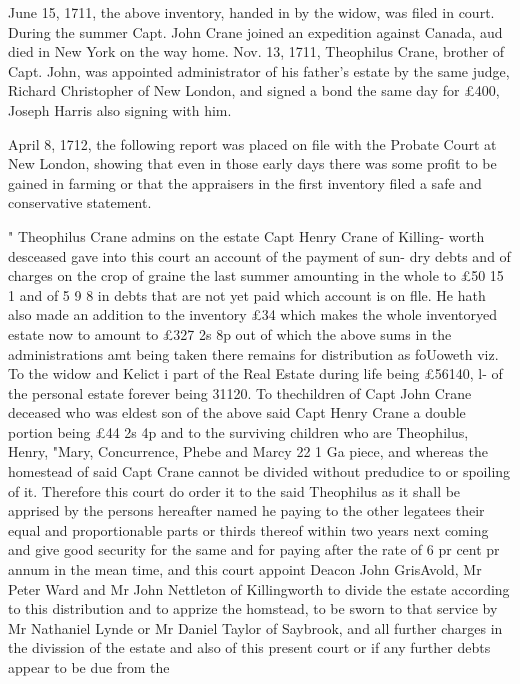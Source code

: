 June 15, 1711, the above inventory, handed in by the widow, 
was filed in court. During the summer Capt. John Crane joined 
an expedition against Canada, aud died in New York on the way 
home. Nov. 13, 1711, Theophilus Crane, brother of Capt. John, 
was appointed administrator of his father's estate by the same 
judge, Richard Christopher of New London, and signed a bond 
the same day for £400, Joseph Harris also signing with him. 

April 8, 1712, the following report was placed on file with the 
Probate Court at New London, showing that even in those early 
days there was some profit to be gained in farming or that the 
appraisers in the first inventory filed a safe and conservative 
statement. 

" Theophilus Crane admins on the estate Capt Henry Crane of Killing- 
worth desceased gave into this court an account of the payment of sun- 
dry debts and of charges on the crop of graine the last summer amounting 
in the whole to £50  15  1 and of 5  9  8 in debts that are not yet paid 
which account is on flle. He hath also made an addition to the inventory 
£34 which makes the whole inventoryed estate now to amount to £327  
2s  8p out of which the above sums in the administrations amt being 
taken there remains for distribution as foUoweth viz. To the widow and 
Kelict i part of the Real Estate during life being £56140, l- of the 
personal estate forever being 31120. To thechildren of Capt John 
Crane deceased who was eldest son of the above said Capt Henry Crane 
a double portion being £44  2s  4p and to the surviving children who are 
Theophilus, Henry, "Mary, Concurrence, Phebe and Marcy 22  1  Ga 
piece, and whereas the homestead of said Capt Crane cannot be divided 
without predudice to or spoiling of it. Therefore this court do order it 
to the said Theophilus as it shall be apprised by the persons hereafter 
named he paying to the other legatees their equal and proportionable 
parts or thirds thereof within two years next coming and give good 
security for the same and for paying after the rate of 6 pr cent pr 
annum in the mean time, and this court appoint Deacon John GrisAvold, 
Mr Peter Ward and Mr John Nettleton of Killingworth to divide the 
estate according to this distribution and to apprize the homstead, to be 
sworn to that service by Mr Nathaniel Lynde or Mr Daniel Taylor of 
Saybrook, and all further charges in the divission of the estate and also 
of this present court or if any further debts appear to be due from the 




